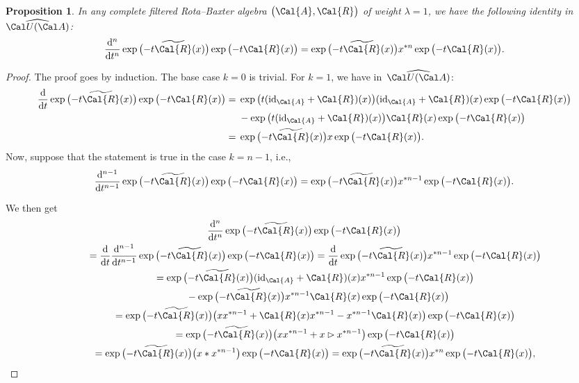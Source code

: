 \documentclass[10pt,a4paper]{amsart}
\numberwithin{equation}{section}
\newtheorem{Proposition}[Theorem]{Proposition}
 { \theoremstyle{definition}
\newtheorem{Definition}[Theorem]{Definition}
\newtheorem{Note}[Theorem]{Note}
\newtheorem{Example}[Theorem]{Example}
\newtheorem{Remark}[Theorem]{Remark} }
\begin{document}
\begin{Proposition}
In any complete filtered Rota--Baxter algebra $\big(\Cal{A}, \Cal{R}\big)$ of weight $\lambda = 1$, we have the following identity in $\widehat{\Cal U(\Cal A)}$:
\begin{equation}
\label{diffeq1}
\frac{{\rm d}^n}{{\rm d}t^n} \exp\big({-}t \widetilde{\Cal{R}}(x)\big) \exp\big({-}t \Cal{R}(x)\big)
= \exp\big({-}t \widetilde{\Cal{R}}(x)\big) x^{\ast n} \exp\big({-}t \Cal{R}(x)\big).
\end{equation}
\end{Proposition}

\begin{proof}
The proof goes by induction. The base case $k=0$ is trivial. For $k=1$, we have in~$\widehat{\Cal U(\Cal A)}$:
\begin{align*}
\frac{\rm d}{{\rm d}t} \exp\big({-}t \widetilde{\Cal{R}}(x)\big) \exp\big({-}t \Cal{R}(x)\big)
= {}&\exp\big(t ({\rm id}_{\Cal{A}} + \Cal{R})(x)\big) ({\rm id}_{\Cal{A}} + \Cal{R})(x) \exp\big({-}t \Cal{R}(x)\big)
\\
&-\exp\big(t ({\rm id}_{\Cal{A}} + \Cal{R})(x)\big) \Cal{R}(x) \exp\big({-}t \Cal{R}(x)\big)
\\
={}& \exp\big({-}t \widetilde{\Cal{R}}(x)\big) x \exp\big({-}t \Cal{R}(x)\big).
\end{align*}
Now, suppose that the statement is true in the case $k=n-1$, i.e.,
\begin{equation*}
\frac{{\rm d}^{n-1}}{{\rm d}t^{n-1}} \exp\big({-}t \widetilde{\Cal{R}}(x)\big) \exp\big({-}t \Cal{R}(x)\big)
= \exp\big({-}t \widetilde{\Cal{R}}(x)\big) x^{\ast {n-1}} \exp\big({-}t \Cal{R}(x)\big).
\end{equation*}
{\samepage We then get
\begin{gather*}
\frac{{\rm d}^{n}}{{\rm d}t^{n}} \exp\big({-}t \widetilde{\Cal{R}}(x)\big) \exp\big({-}t \Cal{R}(x)\big)
\\ \qquad
{} = \frac{\rm d}{{\rm d}t} \frac{{\rm d}^{n-1}}{{\rm d}t^{n-1}} \exp\big({-}t \widetilde{\Cal{R}}(x)\big) \exp\big({-}t \Cal{R}(x)\big)
 = \frac{\rm d}{{\rm d}t} \exp\big({-}t \widetilde{\Cal{R}}(x)\big) x^{\ast {n-1}} \exp\big({-}t \Cal{R}(x)\big)
\\ \qquad
{}= \exp\big({-}t \widetilde{\Cal{R}}(x)\big) ({\rm id}_{\Cal{A}} + \Cal{R})(x) x^{\ast n-1}
\exp\big({-}t \Cal{R}(x)\big)
\\ \qquad\hphantom{=}
{} - \exp\big({-}t \widetilde{\Cal{R}}(x)\big) x^{\ast n-1}\Cal{R}(x) \exp\big({-}t \Cal{R}(x)\big)
\\ \qquad
{}= \exp\big({-}t \widetilde{\Cal{R}}(x)\big) \big(x x^{\ast n-1} + \Cal{R}(x) x^{\ast n-1} - x^{\ast n-1} \Cal{R}(x)\big) \exp\big({-}t \Cal{R}(x)\big)
\\ \qquad
{} = \exp\big({-}t \widetilde{\Cal{R}}(x)\big) \big(x x^{\ast n-1} + x \rhd x^{\ast n-1}\big) \exp\big({-}t \Cal{R}(x)\big)
\\ \qquad
{}= \exp\big({-}t \widetilde{\Cal{R}}(x)\big) \big( x \ast x^{\ast n-1}\big) \exp\big({-}t \Cal{R}(x)\big)
 = \exp\big({-}t \widetilde{\Cal{R}}(x)\big) x^{\ast {n}} \exp\big({-}t \Cal{R}(x)\big),
\end{gather*}

}
\end{proof}
\end{document}

